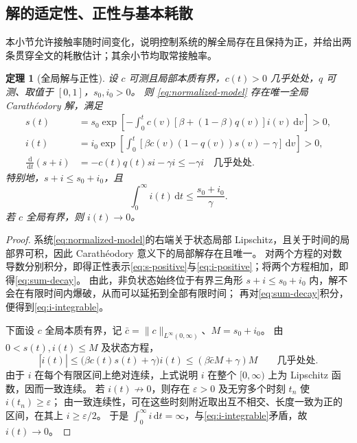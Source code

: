 \documentclass[11pt,a4paper,UTF8]{ctexart}
\newtheorem{theorem}{定理}[section]
\theoremstyle{definition}
\newcommand{\dd}{\,\mathrm d}
\begin{document}
\subsection{解的适定性、正性与基本耗散}
\label{sec:wellposed}
本小节允许接触率随时间变化，说明控制系统的解全局存在且保持为正，并给出两条贯穿全文的耗散估计；其余小节均取常接触率。
\begin{theorem}[全局解与正性]
\label{thm:wellposed}
设 $c$ 可测且局部本质有界，$c(t)>0$ 几乎处处，$q$ 可测、取值于 $[0,1]$，$s_0,i_0>0$。
则 \eqref{eq:normalized-model} 存在唯一全局 Carath\'eodory 解，满足
\begin{align}
s(t)&=s_0\exp\left[-\int_0^t c(v)[\beta+(1-\beta)q(v)]i(v)\dd v\right]>0,
\label{eq:s-positive}\\
i(t)&=i_0\exp\left[\int_0^t[\beta c(v)(1-q(v))s(v)-\gamma]\dd v\right]>0,
\label{eq:i-positive}\\
\frac{\dd}{\dd t}(s+i)&=-c(t)q(t)si-\gamma i\le-\gamma i\quad\text{几乎处处}.
\label{eq:sum-decay}
\end{align}
特别地，$s+i\le s_0+i_0$，且
\begin{equation}
\int_0^\infty i(t)\dd t\le\frac{s_0+i_0}{\gamma}.
\label{eq:i-integrable}
\end{equation}
若 $c$ 全局有界，则 $i(t)\to0$。
\end{theorem}
\begin{proof}
系统\eqref{eq:normalized-model}的右端关于状态局部 Lipschitz，且关于时间的局部界可积，因此 Carath\'eodory 意义下的局部解存在且唯一。
对两个方程的对数导数分别积分，即得正性表示\eqref{eq:s-positive}与\eqref{eq:i-positive}；将两个方程相加，即得\eqref{eq:sum-decay}。
由此，非负状态始终位于有界三角形 $s+i\le s_0+i_0$ 内，解不会在有限时间内爆破，从而可以延拓到全部有限时间；
再对\eqref{eq:sum-decay}积分，便得到\eqref{eq:i-integrable}。

下面设 $c$ 全局本质有界，记
$\bar c =\|c\|_{L^\infty(0,\infty)}$、$M=s_0+i_0$。
由 $0<s(t),i(t)\le M$ 及状态方程，
\[
 |\dot i(t)|
 \le \bigl(\beta c(t)s(t)+\gamma\bigr)i(t)
 \le (\beta \bar c M+\gamma)M
 \qquad\text{几乎处处}.
\]
由于 $i$ 在每个有限区间上绝对连续，上式说明 $i$ 在整个 $[0,\infty)$ 上为 Lipschitz 函数，因而一致连续。
若 $i(t)\not\to0$，则存在 $\varepsilon>0$ 及无穷多个时刻 $t_n$ 使 $i(t_n)\ge\varepsilon$；
由一致连续性，可在这些时刻附近取出互不相交、长度一致为正的区间，在其上 $i\ge\varepsilon/2$。
于是 $\int_0^\infty i\dd t=\infty$，与\eqref{eq:i-integrable}矛盾，故 $i(t)\to0$。
\end{proof}
\end{document}
